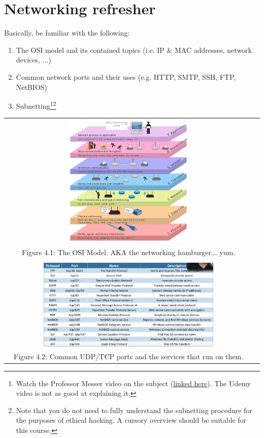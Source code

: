 \documentclass[a4paper,11pt]{article}
\begin{document}
\section{Networking refresher}

Basically, be familiar with the following:
\begin{enumerate}
    \item The OSI model and its contained topics (i.e. IP \& MAC addresses, network devices, ...)
    \item Common network ports and their uses (e.g. HTTP, SMTP, SSH, FTP, NetBIOS)
    \item Subnetting\footnote[1]{Watch the Professor Messer video on the subject (\href{https://www.youtube.com/watch?v=ZxAwQB8TZsM}{linked here}). The Udemy video is not as good at explaining it.}\footnote[2]{Note that you do not need to fully understand the subnetting procedure for the purposes of ethical hacking. A cursory overview should be suitable for this course.}
\end{enumerate}
\begin{center}
    \begin{tabular}{ c c }
        \includegraphics[width=0.5\textwidth]{images/osi.png}
        \\
        \small{Figure 4.1: The OSI Model. AKA the networking hamburger... yum.}
        \\
        \\
        \includegraphics[width=0.7\textwidth]{images/ports.png}
        \\
        \small{Figure 4.2: Common UDP/TCP ports and the services that run on them.}
        
    \end{tabular}
\end{center}
\end{document}
